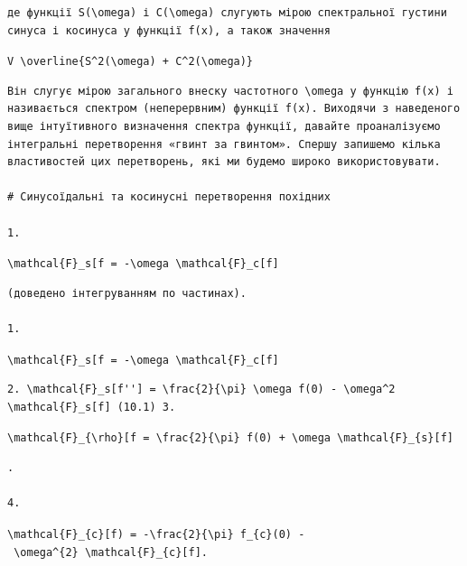 \documentclass[
  ukrainian,
]{article}
\begin{document}
\begin{verbatim}
де функції S(\omega) і C(\omega) слугують мірою спектральної густини синуса і косинуса у функції f(x), а також значення
\end{verbatim}

\texttt{V\ \textbackslash{}overline\{S\^{}2(\textbackslash{}omega)\ +\ C\^{}2(\textbackslash{}omega)\}}

\begin{verbatim}
Він слугує мірою загального внеску частотного \omega у функцію f(x) і називається спектром (неперервним) функції f(x). Виходячи з наведеного вище інтуїтивного визначення спектра функції, давайте проаналізуємо інтегральні перетворення «гвинт за гвинтом». Спершу запишемо кілька властивостей цих перетворень, які ми будемо широко використовувати.

# Синусоїдальні та косинусні перетворення похідних

1.
\end{verbatim}

\texttt{\textbackslash{}mathcal\{F\}\_s{[}f\textquotesingle{}{]}\ =\ -\textbackslash{}omega\ \textbackslash{}mathcal\{F\}\_c{[}f{]}}

\begin{verbatim}
(доведено інтегруванням по частинах).

1.
\end{verbatim}

\texttt{\textbackslash{}mathcal\{F\}\_s{[}f\textquotesingle{}{]}\ =\ -\textbackslash{}omega\ \textbackslash{}mathcal\{F\}\_c{[}f{]}}

\begin{verbatim}
2. \mathcal{F}_s[f''] = \frac{2}{\pi} \omega f(0) - \omega^2 \mathcal{F}_s[f] (10.1) 3.
\end{verbatim}

\texttt{\textbackslash{}mathcal\{F\}\_\{\textbackslash{}rho\}{[}f\textquotesingle{}{]}\ =\ \textbackslash{}frac\{2\}\{\textbackslash{}pi\}\ f(0)\ +\ \textbackslash{}omega\ \textbackslash{}mathcal\{F\}\_\{s\}{[}f{]}}

\begin{verbatim}
.

4.
\end{verbatim}

\texttt{\textbackslash{}mathcal\{F\}\_\{c\}{[}f\textquotesingle{}\textquotesingle{})\ =\ -\textbackslash{}frac\{2\}\{\textbackslash{}pi\}\ f\_\{c\}(0)\ -\ \textbackslash{}omega\^{}\{2\}\ \textbackslash{}mathcal\{F\}\_\{c\}{[}f{]}.}
\end{document}
